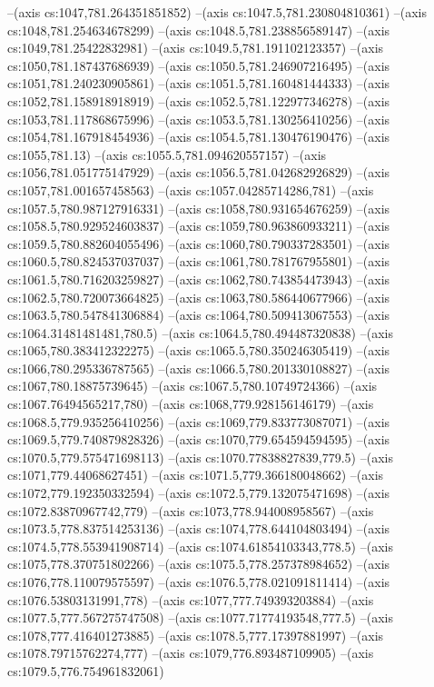 --(axis cs:1047,781.264351851852)
--(axis cs:1047.5,781.230804810361)
--(axis cs:1048,781.254634678299)
--(axis cs:1048.5,781.238856589147)
--(axis cs:1049,781.25422832981)
--(axis cs:1049.5,781.191102123357)
--(axis cs:1050,781.187437686939)
--(axis cs:1050.5,781.246907216495)
--(axis cs:1051,781.240230905861)
--(axis cs:1051.5,781.160481444333)
--(axis cs:1052,781.158918918919)
--(axis cs:1052.5,781.122977346278)
--(axis cs:1053,781.117868675996)
--(axis cs:1053.5,781.130256410256)
--(axis cs:1054,781.167918454936)
--(axis cs:1054.5,781.130476190476)
--(axis cs:1055,781.13)
--(axis cs:1055.5,781.094620557157)
--(axis cs:1056,781.051775147929)
--(axis cs:1056.5,781.042682926829)
--(axis cs:1057,781.001657458563)
--(axis cs:1057.04285714286,781)
--(axis cs:1057.5,780.987127916331)
--(axis cs:1058,780.931654676259)
--(axis cs:1058.5,780.929524603837)
--(axis cs:1059,780.963860933211)
--(axis cs:1059.5,780.882604055496)
--(axis cs:1060,780.790337283501)
--(axis cs:1060.5,780.824537037037)
--(axis cs:1061,780.781767955801)
--(axis cs:1061.5,780.716203259827)
--(axis cs:1062,780.743854473943)
--(axis cs:1062.5,780.720073664825)
--(axis cs:1063,780.586440677966)
--(axis cs:1063.5,780.547841306884)
--(axis cs:1064,780.509413067553)
--(axis cs:1064.31481481481,780.5)
--(axis cs:1064.5,780.494487320838)
--(axis cs:1065,780.383412322275)
--(axis cs:1065.5,780.350246305419)
--(axis cs:1066,780.295336787565)
--(axis cs:1066.5,780.201330108827)
--(axis cs:1067,780.18875739645)
--(axis cs:1067.5,780.10749724366)
--(axis cs:1067.76494565217,780)
--(axis cs:1068,779.928156146179)
--(axis cs:1068.5,779.935256410256)
--(axis cs:1069,779.833773087071)
--(axis cs:1069.5,779.740879828326)
--(axis cs:1070,779.654594594595)
--(axis cs:1070.5,779.575471698113)
--(axis cs:1070.77838827839,779.5)
--(axis cs:1071,779.44068627451)
--(axis cs:1071.5,779.366180048662)
--(axis cs:1072,779.192350332594)
--(axis cs:1072.5,779.132075471698)
--(axis cs:1072.83870967742,779)
--(axis cs:1073,778.944008958567)
--(axis cs:1073.5,778.837514253136)
--(axis cs:1074,778.644104803494)
--(axis cs:1074.5,778.553941908714)
--(axis cs:1074.61854103343,778.5)
--(axis cs:1075,778.370751802266)
--(axis cs:1075.5,778.257378984652)
--(axis cs:1076,778.110079575597)
--(axis cs:1076.5,778.021091811414)
--(axis cs:1076.53803131991,778)
--(axis cs:1077,777.749393203884)
--(axis cs:1077.5,777.567275747508)
--(axis cs:1077.71774193548,777.5)
--(axis cs:1078,777.416401273885)
--(axis cs:1078.5,777.17397881997)
--(axis cs:1078.79715762274,777)
--(axis cs:1079,776.893487109905)
--(axis cs:1079.5,776.754961832061)
